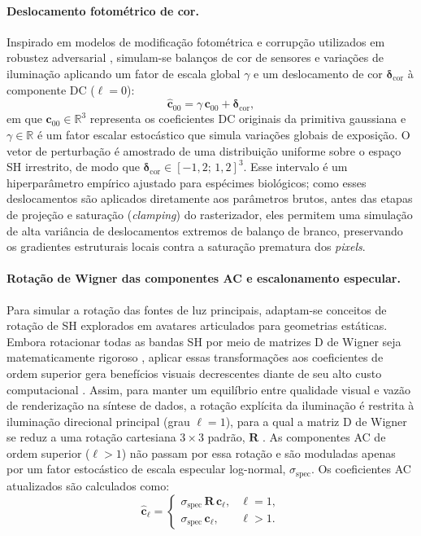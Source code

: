 \documentclass[a4paper,12pt]{article}
\begin{document}
{\paragraph{Deslocamento fotométrico de cor.} Inspirado em modelos de modificação fotométrica e corrupção utilizados em robustez adversarial \cite{wang20243dgaa}, simulam-se balanços de cor de sensores e variações de iluminação aplicando um fator de escala global $\gamma$ e um deslocamento de cor $\boldsymbol{\delta}_{\text{cor}}$ à componente DC ($\ell = 0$):
\begin{equation}
  \hat{\mathbf{c}}_{00} = \gamma\,\mathbf{c}_{00} + \boldsymbol{\delta}_{\text{cor}},
\end{equation}
em que $\mathbf{c}_{00} \in \mathbb{R}^{3}$ representa os coeficientes DC originais da primitiva gaussiana e $\gamma \in \mathbb{R}$ é um fator escalar estocástico que simula variações globais de exposição. O vetor de perturbação é amostrado de uma distribuição uniforme sobre o espaço SH irrestrito, de modo que $\boldsymbol{\delta}_{\text{cor}} \in [-1{,}2;\, 1{,}2]^{3}$. Esse intervalo é um hiperparâmetro empírico ajustado para espécimes biológicos; como esses deslocamentos são aplicados diretamente aos parâmetros brutos, antes das etapas de projeção e saturação (\emph{clamping}) do rasterizador, eles permitem uma simulação de alta variância de deslocamentos extremos de balanço de branco, preservando os gradientes estruturais locais contra a saturação prematura dos \emph{pixels}.

\paragraph{Rotação de Wigner das componentes AC e escalonamento especular.} Para simular a rotação das fontes de luz principais, adaptam-se conceitos de rotação de SH explorados em avatares articulados \cite{hu2024gauhuman, gkitsas2024skinning} para geometrias estáticas. Embora rotacionar todas as bandas SH por meio de matrizes D de Wigner seja matematicamente rigoroso \cite{gkitsas2024skinning}, aplicar essas transformações aos coeficientes de ordem superior gera benefícios visuais decrescentes diante de seu alto custo computacional \cite{hu2024gauhuman}. Assim, para manter um equilíbrio entre qualidade visual e vazão de renderização na síntese de dados, a rotação explícita da iluminação é restrita à iluminação direcional principal (grau $\ell = 1$), para a qual a matriz D de Wigner se reduz a uma rotação cartesiana $3\times 3$ padrão, $\mathbf{R}$ \cite{gkitsas2024skinning}. As componentes AC de ordem superior ($\ell > 1$) não passam por essa rotação e são moduladas apenas por um fator estocástico de escala especular log-normal, $\sigma_{\text{spec}}$. Os coeficientes AC atualizados são calculados como:
\begin{equation}
  \hat{\mathbf{c}}_{\ell} =
  \begin{cases}
    \sigma_{\text{spec}}\,\mathbf{R}\,\mathbf{c}_{\ell}, & \ell = 1,\\[2pt]
    \sigma_{\text{spec}}\,\mathbf{c}_{\ell}, & \ell > 1.
  \end{cases}
\end{equation}

}
\end{document}
